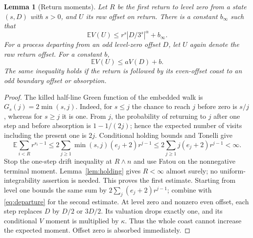 \documentclass[11pt]{amsart}
\newtheorem{lemma}[theorem]{Lemma}
\theoremstyle{definition}
\theoremstyle{remark}
\newcommand{\E}{\mathbb E}
\begin{document}
\begin{lemma}[Return moments]\label{lem:moment}
Let $R$ be the first return to level zero from a state $(s,D)$ with $s>0$, and $U$ its raw offset on return. There is a constant $b_\infty$ such that
\[
 \E V(U)\le r^s|D/3^s|^\alpha+b_\infty.
\]
For a process departing from an odd level-zero offset $D$, let $U$ again denote the raw return offset. For a constant $b$,
\[
 \E V(U)\le aV(D)+b.
\]
The same inequality holds if the return is followed by its even-offset coast to an odd boundary offset or absorption.
\end{lemma}
\begin{proof}
The killed half-line Green function of the embedded walk is
$G_s(j)=2\min(s,j)$. Indeed, for $s\le j$ the chance to reach $j$ before zero is $s/j$, whereas for $s\ge j$ it is one. From $j$, the probability of returning to $j$ after one step and before absorption is $1-1/(2j)$; hence the expected number of visits including the present one is $2j$.
Conditional holding bounds and Tonelli give
\[
 \E\sum_{i<R}r^{s_i-1}
 \le2\sum_{j\ge1}\min(s,j)(e_j+2)r^{j-1}
 \le2\sum_{j\ge1}j(e_j+2)r^{j-1}<\infty.
\]
Stop the one-step drift inequality at $R\wedge n$ and use Fatou on the nonnegative terminal moment. Lemma~\ref{lem:holding} gives $R<\infty$ almost surely; no uniform-integrability assertion is needed. This proves the first estimate. Starting from level one bounds the same sum by $2\sum_j(e_j+2)r^{j-1}$; combine with \eqref{eq:departure} for the second estimate.
At level zero and nonzero even offset, each step replaces $D$ by $D/2$ or $3D/2$. Its valuation drops exactly one, and its conditional $V$ moment is multiplied by $\kappa$. Thus the whole coast cannot increase the expected moment. Offset zero is absorbed immediately.
\end{proof}
\end{document}
